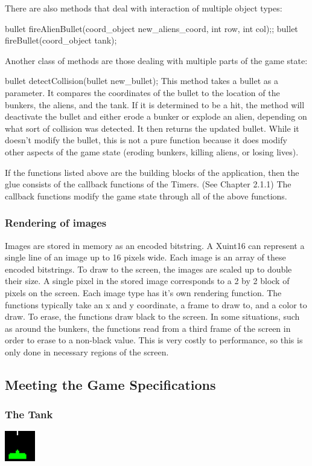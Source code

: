 \documentclass[11pt,letter,oneside]{report}
\begin{document}
There are also methods that deal with interaction of multiple object types:

bullet fireAlienBullet(coord\_object new\_aliens\_coord, int row, int col);;
bullet fireBullet(coord\_object tank);


Another class of methods are those dealing with multiple parts of the game state:

bullet detectCollision(bullet new\_bullet);
  This method takes a bullet as a parameter.  It compares the coordinates of the bullet to the location of the bunkers, the aliens, and the tank.  If it is determined to be a hit, the method will deactivate the bullet and either erode a bunker or explode an alien, depending on what sort of collision was detected.  It then returns the updated bullet.  While it doesn't modify the bullet, this is not a pure function because it does modify other aspects of the game state (eroding bunkers, killing aliens, or losing lives).

If the functions listed above are the building blocks of the application, then the glue consists of the callback functions of the Timers.  (See Chapter 2.1.1)  The callback functions modify the game state through all of the above functions.  

\subsubsection{Rendering of images}
Images are stored in memory as an encoded bitstring.  A Xuint16 can represent a single line of an image up to 16 pixels wide.  Each image is an array of these encoded bitstrings.  To draw to the screen, the images are scaled up to double their size.  A single pixel in the stored image corresponds to a 2 by 2 block of pixels on the screen. Each image type has it's own rendering function.  The functions typically take an x and y coordinate, a frame to draw to, and a color to draw.  To erase, the functions draw black to the screen.  In some situations, such as around the bunkers, the functions read from a third frame of the screen in order to erase to a non-black value.  This is very costly to performance, so this is only done in necessary regions of the screen.




\subsection{Meeting the Game Specifications}

\subsubsection{The Tank}
\includegraphics[]{tank.jpg}
\end{document}
